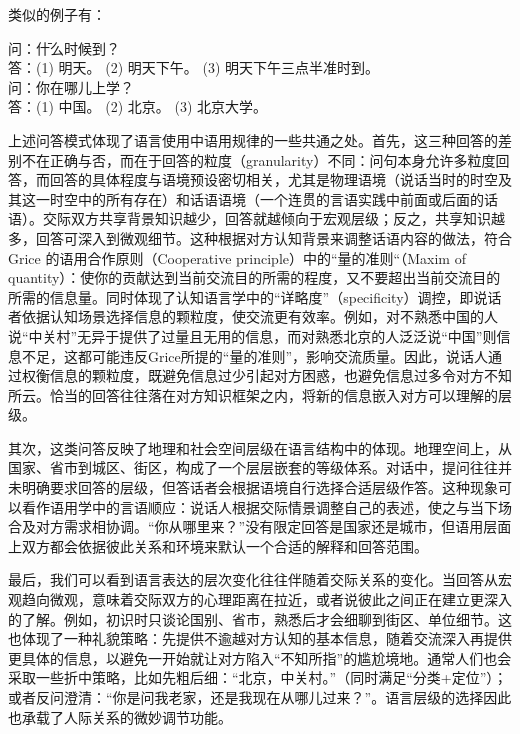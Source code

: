 \documentclass[10pt]{ctexart}
\begin{document}
类似的例子有：
{\kaishu
\begin{tabbing}
    \hspace{1cm}
    问：\=什么时候到？\\[0.5em]
    \hspace{1cm}
    答：\>(1) 明天。 \quad (2) 明天下午。 \quad (3) 明天下午三点半准时到。 \\[0.5em]
    \hspace{1cm}
    问：\>你在哪儿上学？\\[0.5em]
    \hspace{1cm}
    答：\>(1) 中国。 \quad (2) 北京。 \quad (3) 北京大学。
\end{tabbing}
}

上述问答模式体现了语言使用中语用规律的一些共通之处。首先，这三种回答的差别不在正确与否，而在于回答的粒度（granularity）不同：问句本身允许多粒度回答，而回答的具体程度与语境预设密切相关，尤其是物理语境（说话当时的时空及其这⼀时空中的所有存在）和话语语境（⼀个连贯的⾔语实践中前⾯或后⾯的话语）。交际双方共享背景知识越少，回答就越倾向于宏观层级；反之，共享知识越多，回答可深入到微观细节。这种根据对方认知背景来调整话语内容的做法，符合 Grice 的语用合作原则（Cooperative principle）中的``量的准则``（Maxim of quantity）：使你的贡献达到当前交流目的所需的程度，又不要超出当前交流目的所需的信息量。同时体现了认知语言学中的``详略度''（specificity）调控，即说话者依据认知场景选择信息的颗粒度，使交流更有效率。例如，对不熟悉中国的人说``中关村''无异于提供了过量且无用的信息，而对熟悉北京的人泛泛说``中国''则信息不足，这都可能违反Grice所提的``量的准则''，影响交流质量。因此，说话人通过权衡信息的颗粒度，既避免信息过少引起对方困惑，也避免信息过多令对方不知所云。恰当的回答往往落在对方知识框架之内，将新的信息嵌入对方可以理解的层级。

其次，这类问答反映了地理和社会空间层级在语言结构中的体现。地理空间上，从国家、省市到城区、街区，构成了一个层层嵌套的等级体系。对话中，提问往往并未明确要求回答的层级，但答话者会根据语境自行选择合适层级作答。这种现象可以看作语用学中的言语顺应：说话人根据交际情景调整自己的表述，使之与当下场合及对方需求相协调。``你从哪里来？''没有限定回答是国家还是城市，但语用层面上双方都会依据彼此关系和环境来默认一个合适的解释和回答范围。

最后，我们可以看到语言表达的层次变化往往伴随着交际关系的变化。当回答从宏观趋向微观，意味着交际双方的心理距离在拉近，或者说彼此之间正在建立更深入的了解。例如，初识时只谈论国别、省市，熟悉后才会细聊到街区、单位细节。这也体现了一种礼貌策略：先提供不逾越对方认知的基本信息，随着交流深入再提供更具体的信息，以避免一开始就让对方陷入``不知所指''的尴尬境地。通常人们也会采取一些折中策略，比如先粗后细：``北京，中关村。''（同时满足``分类+定位''）；或者反问澄清：``你是问我老家，还是我现在从哪儿过来？''。语言层级的选择因此也承载了人际关系的微妙调节功能。
\end{document}
